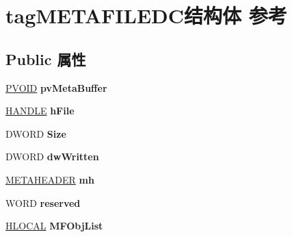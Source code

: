 \hypertarget{structtag_m_e_t_a_f_i_l_e_d_c}{}\section{tag\+M\+E\+T\+A\+F\+I\+L\+E\+D\+C结构体 参考}
\label{structtag_m_e_t_a_f_i_l_e_d_c}
\subsection*{Public 属性}
\begin{DoxyCompactItemize}
\item 
\mbox{\label{structtag_m_e_t_a_f_i_l_e_d_c_a80618bbaba916cd2efcfc7da67dd7ffd}} 
\hyperlink{interfacevoid}{P\+V\+O\+ID} {\bfseries pv\+Meta\+Buffer}
\item 
\mbox{\label{structtag_m_e_t_a_f_i_l_e_d_c_a9fccc1d3a78571d5188b11d54b6aaad6}} 
\hyperlink{interfacevoid}{H\+A\+N\+D\+LE} {\bfseries h\+File}
\item 
\mbox{\label{structtag_m_e_t_a_f_i_l_e_d_c_a11c671c24e6f078daf65455dd9bf1b40}} 
D\+W\+O\+RD {\bfseries Size}
\item 
\mbox{\label{structtag_m_e_t_a_f_i_l_e_d_c_a80ff068a3c97e8f5b79156e66acc72bf}} 
D\+W\+O\+RD {\bfseries dw\+Written}
\item 
\mbox{\label{structtag_m_e_t_a_f_i_l_e_d_c_af02212a6a992fb37afd3090921a89327}} 
\hyperlink{structtag_m_e_t_a_h_e_a_d_e_r}{M\+E\+T\+A\+H\+E\+A\+D\+ER} {\bfseries mh}
\item 
\mbox{\label{structtag_m_e_t_a_f_i_l_e_d_c_a66d851316a013c4b07845137092678f0}} 
W\+O\+RD {\bfseries reserved}
\item 
\mbox{\label{structtag_m_e_t_a_f_i_l_e_d_c_af0fc1605cae12fce0c9643fc03057d32}} 
\hyperlink{interfacevoid}{H\+L\+O\+C\+AL} {\bfseries M\+F\+Obj\+List}
\item 
\mbox{\label{structtag_m_e_t_a_f_i_l_e_d_c_a820af76d04137291ffdfad0fb68deb3c}} 

\end{DoxyCompactItemize}
